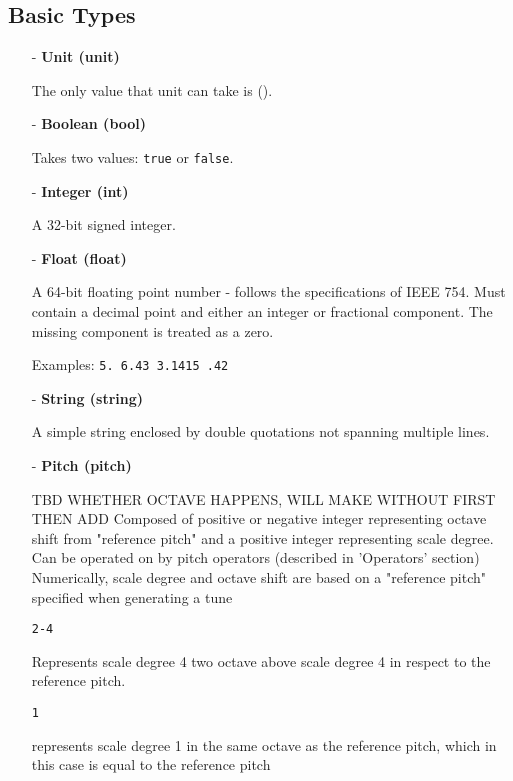 \documentclass[12pt]{report}
\begin{document}
\subsection{Basic Types}

\begin{itemize}
\item[-] \textbf{Unit (unit)}

			The only value that unit can take is (). 
			
\item[-] \textbf{Boolean (bool)}

			Takes two values: \texttt{true} or \texttt{false}.

\item[-] \textbf{Integer (int)}

			A 32-bit signed integer.

\item[-] \textbf{Float (float)}

			A 64-bit floating point number - follows the specifications of IEEE 754. Must contain a decimal point and either an integer or fractional component. The missing component is treated as a zero. 
			
			Examples: \texttt{5.    6.43    3.1415  .42}
			
\item[-] \textbf{String (string)}

            A simple string enclosed by double quotations not spanning multiple lines.

\item[-] \textbf{Pitch (pitch)}

		
		TBD WHETHER OCTAVE HAPPENS, WILL MAKE WITHOUT FIRST THEN ADD
		Composed of positive or negative integer representing octave shift from "reference pitch" and
		a positive integer representing scale degree. 
		Can be operated on by pitch operators (described in 'Operators' section)
		Numerically, scale degree and octave shift are based on a "reference pitch" specified when generating a tune
		
		
		\texttt{2-4}
		
		Represents scale degree 4 two octave above scale degree 4 in respect to the reference pitch.
		
		
        \texttt{1} 
        
        represents scale degree 1 in the same octave as the reference pitch, which in this case is equal to the reference pitch
 
\end{itemize}
\medskip
\end{document}
